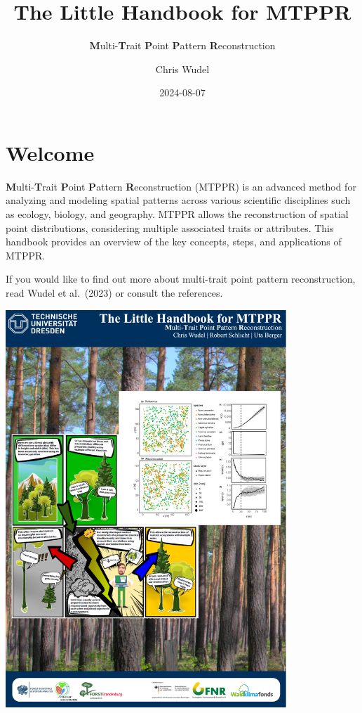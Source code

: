 \documentclass[
  letterpaper,
  DIV=11,
  numbers=noendperiod]{scrreprt}
\title{The Little Handbook for MTPPR}
\subtitle{\textbf{M}ulti-\textbf{T}rait \textbf{P}oint \textbf{P}attern
\textbf{R}econstruction}
\author{Chris Wudel}
\date{2024-08-07}
\renewcommand*\contentsname{Table of contents}
\newcommand\contentsname{Table of contents}
\begin{document}
\maketitle

\renewcommand*\contentsname{Table of contents}
{
\hypersetup{linkcolor=}
\setcounter{tocdepth}{2}
\tableofcontents
}


\chapter*{Welcome}\label{welcome}


\textbf{M}ulti-\textbf{T}rait \textbf{P}oint \textbf{P}attern
\textbf{R}econstruction (MTPPR) is an advanced method for analyzing and
modeling spatial patterns across various scientific disciplines such as
ecology, biology, and geography. MTPPR allows the reconstruction of
spatial point distributions, considering multiple associated traits or
attributes. This handbook provides an overview of the key concepts,
steps, and applications of MTPPR.

If you would like to find out more about multi-trait point pattern
reconstruction, read Wudel et al.~(2023) or consult the references.

\begin{center}
\includegraphics[width=4.16667in,height=\textheight]{images/cover.png}
\end{center}
\end{document}
